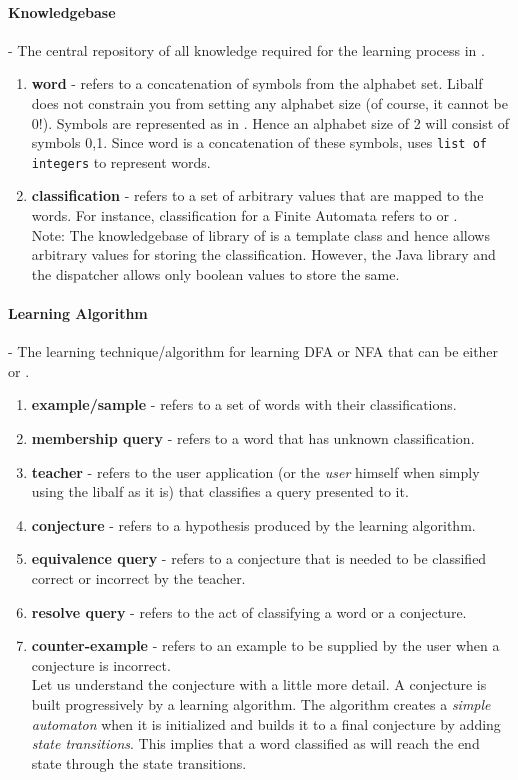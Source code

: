 \paragraph{Knowledgebase} - The central repository of all knowledge required for the learning process in \libalf.
\begin{enumerate}
 \item \textbf{word} - refers to a concatenation of symbols from the alphabet set. Libalf does not constrain you from setting any alphabet size (of course, it cannot be 0!). Symbols are represented as \integer in \libalf. Hence an alphabet size of 2 will consist of symbols {0,1}. Since word is a concatenation of these symbols, \libalf uses \texttt{list of integers} to represent words. 

 \item \textbf{classification} - refers to a set of arbitrary values that are mapped to the words. For instance, classification for a Finite Automata refers to \true or \false. \\
Note: The knowledgebase of \cpp library of \libalf is a template class and hence allows arbitrary values for storing the classification. However, the \jalf Java library and the dispatcher allows only boolean values to store the same. 
\end{enumerate}
\paragraph{Learning Algorithm} - The learning technique/algorithm for learning DFA or NFA that can be either \online or \offline.
\begin{enumerate}
 \item \textbf{example/sample} - refers to a set of words with their classifications.
 \item \textbf{membership query} - refers to a word that has unknown classification.
 \item \textbf{teacher} - refers to the user application (or the \emph{user} himself when simply using the libalf as it is) that classifies a query presented to it.
 \item \textbf{conjecture} - refers to a hypothesis produced by the learning algorithm. 
 \item \textbf{equivalence query} - refers to a conjecture that is needed to be classified correct or incorrect by the teacher.
 \item \textbf{resolve query} - refers to the act of classifying a word or a conjecture. 
 \item \textbf{counter-example} - refers to an example to be supplied by the user when a conjecture is incorrect. \\
Let us understand the conjecture with a little more detail. A conjecture is built progressively by a learning algorithm. The algorithm creates a \emph{simple automaton} when it is initialized and builds it to a final conjecture by adding \emph{state transitions}. This implies that a word classified as \true will reach the end state through the state transitions. 

\end{enumerate}
